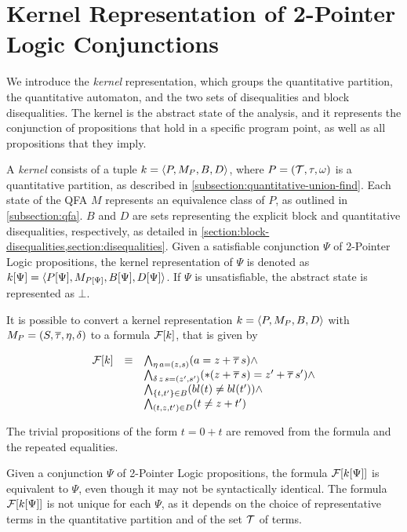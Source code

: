 



\section{Kernel Representation of 2-Pointer Logic Conjunctions}

We introduce the \emph{kernel} representation, which groups the quantitative partition, the quantitative automaton, and the two sets of disequalities and block disequalities.
The kernel is the abstract state of the analysis, and it represents the conjunction of propositions that hold in a specific program point, as well as all propositions that they imply.

A \emph{kernel} consists of a tuple $k = \langle P,M_P,B,D\rangle$, where $P = (\mathcal{T}, \tau, \omega)$ is a quantitative partition, as described in \cref{subsection:quantitative-union-find}.
Each state of the QFA $M$ represents an equivalence class of $P$, as outlined in \cref{subsection:qfa}.
$B$ and $D$ are sets representing the explicit block and quantitative disequalities, respectively, as detailed in \cref{section:block-disequalities,section:disequalities}.
Given a satisfiable conjunction $\Psi$ of 2-Pointer Logic propositions, the kernel representation of $\Psi$ is denoted as $k[\Psi] = \langle P[\Psi],M_{P[\Psi]},B[\Psi],D[\Psi]\rangle$.
If $\Psi$ is unsatisfiable, the abstract state is represented as $\bot$.

It is possible to convert a kernel representation $k = \langle P,M_P,B,D\rangle$ with $M_P = (S, \overline{\tau}, \eta, \delta)$ to a formula $\mathcal{F}[k]$, that is given by

\[
  \begin{array}{lll}
    \mathcal{F}[k] & \equiv & \bigwedge_{\eta\,a=(z,s)} (a = z + \overline{\tau}\,s) \land                            \\
          &        & \bigwedge_{\delta\,z\,s=(z',s')} (*(z + \overline{\tau}\,s) = z' + \overline{\tau}\,s') \land     \\
          &        & \bigwedge_{\{t,t'\}\in B} (bl(t) \neq bl(t')) \land \\
          &        & \bigwedge_{(t,z, t') \in D}(t \neq z + t')
  \end{array}
\]

The trivial propositions of the form $t = 0 + t$ are removed from the formula and the repeated equalities.

Given a conjunction $\Psi$ of 2-Pointer Logic propositions, the formula $\mathcal{F}[k[\Psi]]$ is equivalent to $\Psi$, even though it may not be syntactically identical.
The formula $\mathcal{F}[k[\Psi]]$ is not unique for each $\Psi$, as it depends on the choice of representative terms in the quantitative partition and of the set $\mathcal{T}$ of terms.

